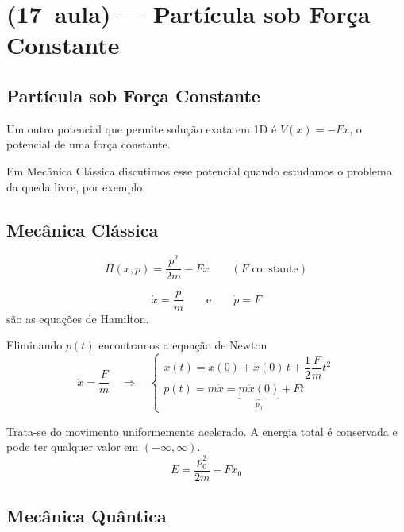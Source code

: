 \section*{(17\textordfeminine\ aula) --- Partícula sob Força Constante}

\subsection*{Partícula sob Força Constante}

Um outro potencial que permite solução exata em 1D é $V(x) = -Fx$, o potencial de uma força constante.

Em Mecânica Clássica discutimos esse potencial quando estudamos o problema da queda livre, por exemplo.

\subsection*{Mecânica Clássica}

\begin{equation}
    H(x,p) = \frac{p^2}{2m} - Fx \qquad (F \text{ constante})
\label{eq:aula17_H_classica}
\end{equation}

\begin{equation}
    \dot{x} = \frac{p}{m} \qquad \text{e} \qquad \dot{p} = F
\label{eq:aula17_eqs_hamilton}
\end{equation}
são as equações de Hamilton.

Eliminando $p(t)$ encontramos a equação de Newton
\begin{equation}
    \ddot{x} = \frac{F}{m} \quad \Longrightarrow \quad
    \begin{cases}
        x(t) = x(0) + \dot{x}(0)\, t + \dfrac{1}{2}\dfrac{F}{m} t^2 \\[2mm]
        p(t) = m\dot{x} = \underbrace{m\dot{x}(0)}_{p_0} + Ft
    \end{cases}
\label{eq:aula17_eq_newton}
\end{equation}

Trata-se do movimento uniformemente acelerado. A energia total é conservada e pode ter qualquer valor em $(-\infty, \infty)$.
\begin{equation}
    E = \frac{p_0^2}{2m} - Fx_0
\label{eq:aula17_energia_classica}
\end{equation}

\subsection*{Mecânica Quântica}

